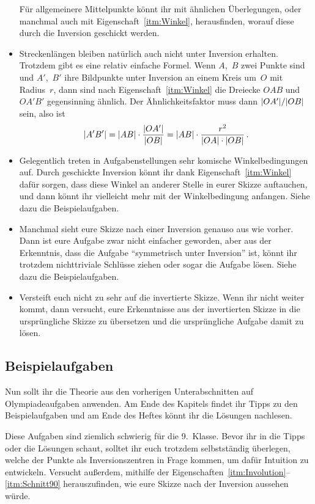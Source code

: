 \begin{itemize}
	Für allgemeinere Mittelpunkte könnt ihr mit ähnlichen Überlegungen, oder manchmal auch mit Eigenschaft~\ref{itm:Winkel}, herausfinden, worauf diese durch die Inversion geschickt werden.
	\item Streckenlängen bleiben natürlich auch nicht unter Inversion erhalten. Trotzdem gibt es eine relativ einfache Formel. Wenn $A$,~$B$ zwei Punkte sind und $A'$,~$B'$ ihre Bildpunkte unter Inversion an einem Kreis um~$O$ mit Radius~$r$, dann sind nach Eigenschaft~\ref{itm:Winkel} die Dreiecke $OAB$ und $OA'B'$ gegensinning ähnlich. Der Ähnlichkeitsfaktor muss dann $\lvert OA'\rvert/\lvert OB\rvert$ sein, also ist
	\begin{equation*}%
		\abs{A'B'}=\abs{AB}\cdot \frac{\abs{OA'}}{\abs{OB}}=\abs{AB}\cdot \frac{r^2}{\abs{OA}\cdot\abs{OB}}\,.
	\end{equation*}
	\item Gelegentlich treten in Aufgabenstellungen sehr komische Winkelbedingungen auf. Durch geschickte Inversion könnt ihr dank Eigenschaft~\ref{itm:Winkel} dafür sorgen, dass diese Winkel an anderer Stelle in eurer Skizze auftauchen, und dann könnt ihr vielleicht mehr mit der Winkelbedingung anfangen. Siehe dazu die Beispielaufgaben.
	\item Manchmal sieht eure Skizze nach einer Inversion genauso aus wie vorher. Dann ist eure Aufgabe zwar nicht einfacher geworden, aber aus der Erkenntnis, dass die Aufgabe \enquote{symmetrisch unter Inversion} ist, könnt ihr trotzdem nichttriviale Schlüsse ziehen oder sogar die Aufgabe lösen. Siehe dazu die Beispielaufgaben.
	\item Versteift euch nicht zu sehr auf die invertierte Skizze. Wenn ihr nicht weiter kommt, dann versucht, eure Erkenntnisse aus der invertierten Skizze in die ursprüngliche Skizze zu übersetzen und die ursprüngliche Aufgabe damit zu lösen.
\end{itemize}

\subsection*{Beispielaufgaben}
Nun sollt ihr die Theorie aus den vorherigen Unterabschnitten auf Olympiadeaufgaben anwenden. Am Ende des Kapitels findet ihr Tipps zu den Beispielaufgaben und am Ende des Heftes könnt ihr die Lösungen nachlesen.

Diese Aufgaben sind ziemlich schwierig für die 9.\ Klasse. Bevor ihr in die Tipps oder die Lösungen schaut, solltet ihr euch trotzdem selbstständig überlegen, welche der Punkte als Inversionszentren in Frage kommen, um dafür Intuition zu entwickeln. Versucht außerdem, mithilfe der Eigenschaften~\ref{itm:Involution}--\ref{itm:Schnitt90} herauszufinden, wie eure Skizze nach der Inversion aussehen würde.

